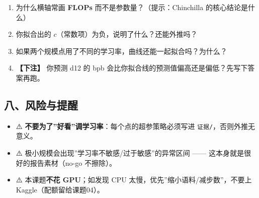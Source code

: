 \documentclass[
  chinese,
  11pt,
]{ctexart}
\providecommand{\tightlist}{%
  \setlength{\itemsep}{0pt}\setlength{\parskip}{0pt}}
\begin{document}
\begin{enumerate}
\def\labelenumi{\arabic{enumi}.}
\tightlist
\item
  为什么横轴常画 \textbf{FLOPs} 而不是参数量？（提示：Chinchilla 的核心结论是什么）
\item
  你拟合出的 \(c\)（常数项）为负，说明了什么？还能外推吗？
\item
  如果两个规模点用了不同的学习率，曲线还能一起拟合吗？为什么？
\item
  \textbf{【下注】} 你预测 d12 的 bpb 会比你拟合线的预测值偏高还是偏低？先写下答案再跑。
\end{enumerate}

\subsection{八、风险与提醒}\label{ux516bux98ceux9669ux4e0eux63d0ux9192}

\begin{itemize}
\tightlist
\item
  ⚠️ \textbf{不要为了''好看''调学习率}：每个点的超参策略必须写进 \texttt{证据/}，否则外推无意义。
\item
  ⚠️ 极小规模会出现''学习率不敏感/过于敏感''的异常区间 ------ 这本身就是很好的报告素材（no-go 不擦除）。
\item
  ⚠️ 本课题\textbf{不花 GPU}；如发现 CPU 太慢，优先''缩小语料/减步数''，不要上 Kaggle（配额留给课题04）。
\end{itemize}
\end{document}
